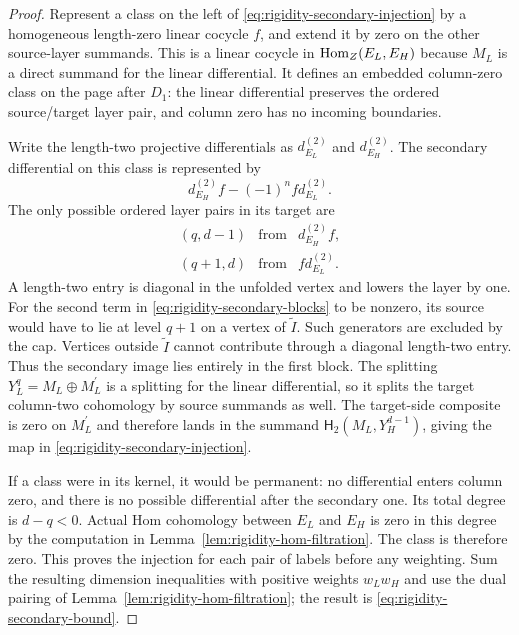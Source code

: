 \begin{proof}
Represent a class on the left of
\eqref{eq:rigidity-secondary-injection} by a homogeneous length-zero
linear cocycle $f$, and extend it by zero on the other source-layer
summands.  This is a linear cocycle in $\operatorname{Hom}_Z(E_L,E_H)$ because $M_L$ is
a direct summand for the linear differential.  It defines an embedded
column-zero class on the page after $D_1$: the linear differential
preserves the ordered source/target layer pair, and column zero has no
incoming boundaries.

Write the length-two projective differentials as $d_{E_L}^{(2)}$ and
$d_{E_H}^{(2)}$.  The secondary differential on this class is represented
by
\[
 d_{E_H}^{(2)}f-(-1)^n f d_{E_L}^{(2)}.
\]
The only possible ordered layer pairs in its target are
\begin{equation}
 \begin{array}{ccl}
 (q,d-1)&\text{from}&d_{E_H}^{(2)}f,\\
 (q+1,d)&\text{from}&f d_{E_L}^{(2)}.
 \end{array}
 \label{eq:rigidity-secondary-blocks}
\end{equation}
A length-two entry is diagonal in the unfolded vertex and lowers the
layer by one.  For the second term in
\eqref{eq:rigidity-secondary-blocks} to be nonzero, its source would have
to lie at level $q+1$ on a vertex of $\widetilde I$.  Such generators are
excluded by the cap.  Vertices outside $\widetilde I$ cannot contribute
through a diagonal length-two entry.  Thus the secondary image lies
entirely in the first block.  The splitting $Y_L^q=M_L\oplus M_L^{\prime}$
is a splitting for the linear differential, so it splits the target
column-two cohomology by source summands as well.  The target-side
composite is zero on $M_L^{\prime}$ and therefore lands in the summand
$\mathsf H_2(M_L,Y_H^{d-1})$, giving the map in
\eqref{eq:rigidity-secondary-injection}.

If a class were in its kernel, it would be permanent: no differential
enters column zero, and there is no possible differential after the
secondary one.  Its total degree is $d-q<0$.  Actual Hom cohomology between
$E_L$ and $E_H$ is zero in this degree by the computation in
Lemma~\ref{lem:rigidity-hom-filtration}.  The class is therefore zero.
This proves the injection for each pair of labels before any weighting.
Sum the resulting dimension inequalities with positive weights $w_Lw_H$
and use the dual pairing of
Lemma~\ref{lem:rigidity-hom-filtration}; the result is
\eqref{eq:rigidity-secondary-bound}.
\end{proof}

